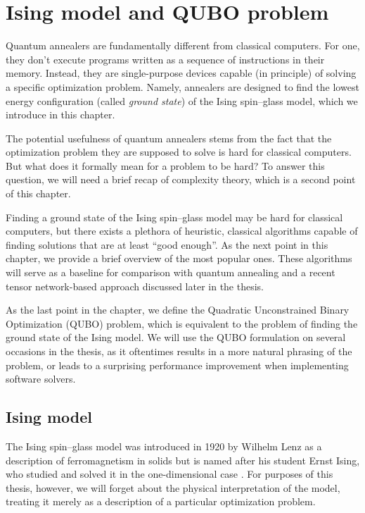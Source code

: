 \chapter{Ising model and QUBO problem}
\label{chapter:ising}

Quantum annealers are fundamentally different from classical computers. For
one, they don't execute programs written as a sequence of instructions in their
memory. Instead, they are single-purpose devices capable (in principle) of
solving a specific optimization problem. Namely, annealers are designed to find
the lowest energy configuration (called \emph{ground state}) of the Ising
spin--glass model, which we introduce in this chapter.

The potential usefulness of quantum annealers stems from the fact that the
optimization problem they are supposed to solve is hard for classical
computers. But what does it formally mean for a problem to be hard? To answer
this question, we will need a brief recap of complexity theory, which is a
second point of this chapter.

Finding a ground state of the Ising spin--glass model may be hard for classical
computers, but there exists a plethora of heuristic, classical algorithms
capable of finding solutions that are at least ``good enough''. As the next
point in this chapter, we provide a brief overview of the most popular ones.
These algorithms will serve as a baseline for comparison with quantum annealing
and a recent tensor network-based approach discussed later in the thesis.

As the last point in the chapter, we define the Quadratic Unconstrained Binary
Optimization (QUBO) problem, which is equivalent to the problem of finding the
ground state of the Ising model. We will use the QUBO formulation on several
occasions in the thesis, as it oftentimes results in a more natural phrasing of
the problem, or leads to a surprising performance improvement when implementing
software solvers.

\section{Ising model}

The Ising spin--glass model was introduced in 1920 by Wilhelm Lenz \cite{lenz}
as a description of ferromagnetism in solids but is named after his student
Ernst Ising, who studied and solved it in the one-dimensional case
\cite{ising}. For purposes of this thesis, however, we will forget about the
physical interpretation of the model, treating it merely as a description of a
particular optimization problem.

